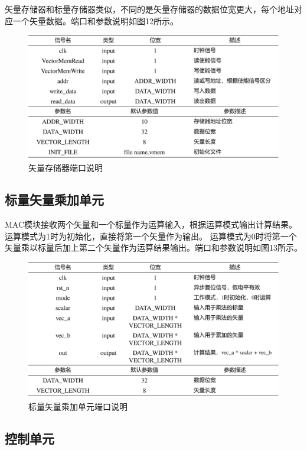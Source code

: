 \documentclass[UTF8]{ctexart}
\begin{document}
矢量存储器和标量存储器类似，不同的是矢量存储器的数据位宽更大，每个地址对应一个矢量数据。端口和参数说明如图12所示。

\begin{figure}[htbp]
    \centering
    \includegraphics[width=16cm]{pic/VectorDCM.png}
    \caption{矢量存储器端口说明}
\end{figure}

\subsection{标量矢量乘加单元}

MAC模块接收两个矢量和一个标量作为运算输入，根据运算模式输出计算结果。运算模式为1时为初始化，直接将第一个矢量作为输出。
运算模式为0时将第一个矢量乘以标量后加上第二个矢量作为运算结果输出。端口和参数说明如图13所示。

\begin{figure}[htbp]
    \centering
    \includegraphics[width=16cm]{pic/MAC.png}
    \caption{标量矢量乘加单元端口说明}
\end{figure}

\subsection{控制单元}
\end{document}
